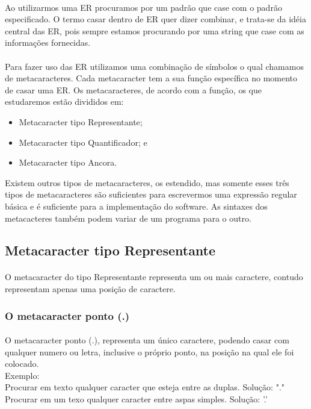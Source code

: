 \documentclass[10pt,a4paper]{article}
\begin{document}
\paragraph*{}
Ao utilizarmos uma ER procuramos por um padrão que case com o padrão especificado. O termo casar dentro de ER quer dizer combinar, e trata-se da idéia central das ER, pois sempre estamos procurando por uma string que case com as informações fornecidas.
\paragraph*{}
Para fazer uso das ER utilizamos uma combinação de símbolos o qual chamamos de metacaracteres. Cada metacaracter tem a sua função específica no momento de casar uma ER. Os metacaracteres, de acordo com a função, os que estudaremos estão divididos em:
\begin{itemize}
\item  Metacaracter tipo Representante;
\item 	Metacaracter tipo Quantificador; e
\item 	Metacaracter tipo Ancora.
\end{itemize}
Existem outros tipos de metacaracteres, os estendido, mas somente esses três tipos de metacaracteres são suficientes para escrevermos uma expressão regular básica e é suficiente para a implementação do software. As sintaxes dos metacacteres também podem variar de um programa para o outro.
\subsection{Metacaracter tipo Representante}
\paragraph*{}
O metacaracter do tipo Representante representa um ou mais caractere, contudo representam apenas uma posição de caractere.
\subsubsection{O metacaracter ponto (.)}
\paragraph*{}
O metacaracter ponto (.), representa um único caractere, podendo casar com qualquer numero ou letra, inclusive o próprio ponto, na posição na qual ele foi colocado.\\
Exemplo:\\
Procurar em texto qualquer caracter que esteja entre as duplas.\newline
Solução: "."\newline
Procurar em um texo qualquer caracter entre aspas simples.\newline
Solução: '.'\newline
\\
\end{document}
